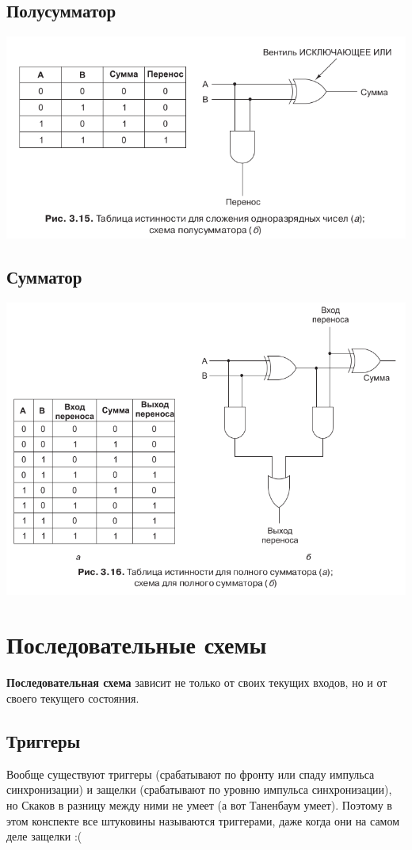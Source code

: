 \documentclass[12pt, a4paper]{article}
\begin{document}
\subsection{Полусумматор}
\includegraphics[scale=0.6]{./images/3_15.png}
\subsection{Сумматор}
\includegraphics[scale=0.6]{./images/3_16.png}
\section{Последовательные схемы}
\textbf{Последовательная схема} зависит не только от своих текущих входов, но и от своего текущего состояния.
\subsection{Триггеры}
Вообще существуют триггеры (срабатывают по фронту или спаду импульса синхронизации) и защелки (срабатывают по уровню импульса синхронизации), но Скаков в разницу между ними не умеет (а вот Таненбаум умеет). Поэтому в этом конспекте все штуковины называются триггерами, даже когда они на самом деле защелки :(
\end{document}
